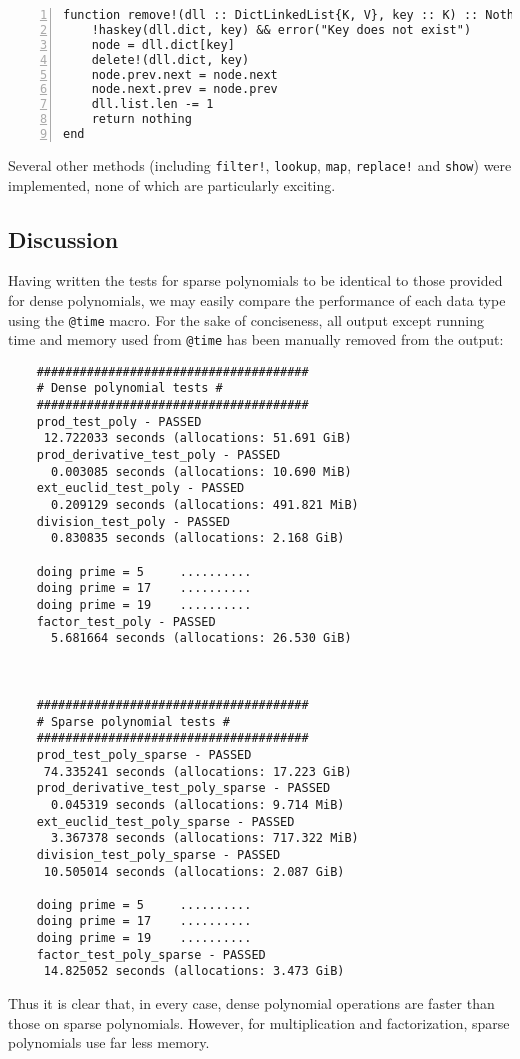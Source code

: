 \documentclass{article}
\theoremstyle{plain}
\numberwithin{theorem}{section}
\numberwithin{example}{section}
\theoremstyle{definition}
\numberwithin{definition}{section}
\begin{document}
\begin{codebox}
    \begin{Verbatim}[numbers=left,xleftmargin=5mm]
function remove!(dll :: DictLinkedList{K, V}, key :: K) :: Nothing where {K, V}
    !haskey(dll.dict, key) && error("Key does not exist")
    node = dll.dict[key]
    delete!(dll.dict, key)
    node.prev.next = node.next
    node.next.prev = node.prev
    dll.list.len -= 1
    return nothing
end
    \end{Verbatim}
\end{codebox}

Several other methods (including \texttt{filter!}, \texttt{lookup},
\texttt{map}, \texttt{replace!} and \texttt{show}) were implemented, none of
which are particularly exciting.

\bigbreak

\subsection{Discussion}

Having written the tests for sparse polynomials to be identical to those
provided for dense polynomials, we may easily compare the performance of each
data type using the \texttt{@time} macro. For the sake of conciseness, all
output except running time and memory used from \texttt{@time} has been manually
removed from the output:

\begin{Verbatim}
    ######################################
    # Dense polynomial tests #
    ######################################
    prod_test_poly - PASSED
     12.722033 seconds (allocations: 51.691 GiB)
    prod_derivative_test_poly - PASSED
      0.003085 seconds (allocations: 10.690 MiB)
    ext_euclid_test_poly - PASSED
      0.209129 seconds (allocations: 491.821 MiB)
    division_test_poly - PASSED
      0.830835 seconds (allocations: 2.168 GiB)

    doing prime = 5 	..........
    doing prime = 17 	..........
    doing prime = 19 	..........
    factor_test_poly - PASSED
      5.681664 seconds (allocations: 26.530 GiB)



    ######################################
    # Sparse polynomial tests #
    ######################################
    prod_test_poly_sparse - PASSED
     74.335241 seconds (allocations: 17.223 GiB)
    prod_derivative_test_poly_sparse - PASSED
      0.045319 seconds (allocations: 9.714 MiB)
    ext_euclid_test_poly_sparse - PASSED
      3.367378 seconds (allocations: 717.322 MiB)
    division_test_poly_sparse - PASSED
     10.505014 seconds (allocations: 2.087 GiB)

    doing prime = 5 	..........
    doing prime = 17 	..........
    doing prime = 19 	..........
    factor_test_poly_sparse - PASSED
     14.825052 seconds (allocations: 3.473 GiB)
\end{Verbatim}

Thus it is clear that, in every case, dense polynomial operations are faster
than those on sparse polynomials. However, for multiplication and factorization,
sparse polynomials use far less memory.
\end{document}
